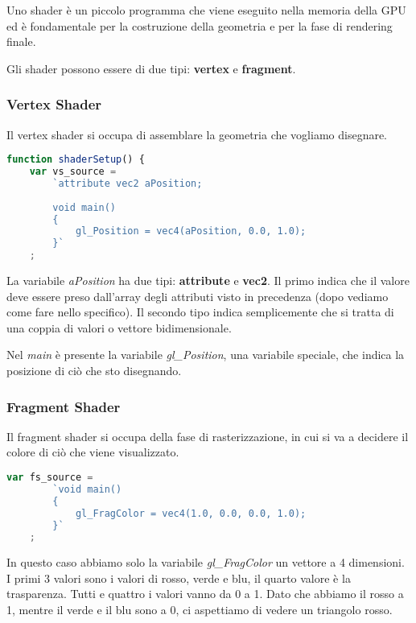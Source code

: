 Uno shader \`e un piccolo programma che viene eseguito nella memoria della GPU ed \`e
fondamentale per la costruzione della geometria e per la fase di rendering finale.

Gli shader possono essere di due tipi: \textbf{vertex} e \textbf{fragment}.

\subsubsection{Vertex Shader}
Il vertex shader si occupa di assemblare la geometria che vogliamo disegnare.
\begin{lstlisting}[language=javascript]
function shaderSetup() {
	var vs_source =
		`attribute vec2 aPosition;
		
		void main()
		{
			gl_Position = vec4(aPosition, 0.0, 1.0);
		}`
	;
\end{lstlisting}
La variabile \emph{aPosition} ha due tipi: \textbf{attribute} e \textbf{vec2}. Il primo
indica che il valore deve essere preso dall'array degli attributi visto in precedenza
(dopo vediamo come fare nello specifico). Il secondo tipo indica semplicemente che
si tratta di una coppia di valori o vettore bidimensionale.

Nel \emph{main} \`e presente la variabile \emph{gl\_Position}, una variabile speciale, che
indica la posizione di ci\`o che sto disegnando.

\subsubsection{Fragment Shader}
Il fragment shader si occupa della fase di rasterizzazione, in cui si va a decidere il
colore di ci\`o che viene visualizzato.
\begin{lstlisting}[language=javascript, firstnumber=8]
	var fs_source =
		`void main()
		{
			gl_FragColor = vec4(1.0, 0.0, 0.0, 1.0);
		}`
	;
\end{lstlisting}
In questo caso abbiamo solo la variabile \emph{gl\_FragColor} un vettore a 4 dimensioni.
I primi 3 valori sono i valori di rosso, verde e blu, il quarto valore \`e la trasparenza.
Tutti e quattro i valori vanno da 0 a 1. Dato che abbiamo il rosso a 1, mentre il verde e
il blu sono a 0, ci aspettiamo di vedere un triangolo rosso.

